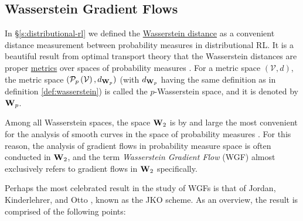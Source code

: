 \subsection{Wasserstein Gradient Flows}\label{s:gradient-flows:wgf}
In \S\ref{s:distributional-rl} we defined the
\hyperref[def:wasserstein]{Wasserstein distance} as a convenient distance
measurement between probability measures in distributional RL. It is a beautiful
result from optimal transport theory that the
Wasserstein distances are proper \hyperref[def:metric-space]{metrics} over
spaces of probability measures \citep{villani2008optimal}. For a metric space
$(\mathcal{V}, d)$, the metric space $(\probset{\mathcal{V}},
\wassermetric[p])$ (with $\wassermetric[p]$ having the same definition as in
definition \ref{def:wasserstein}) is called the $p$-Wasserstein space, and it is denoted by
$\wasserspace[p]$.

Among all Wasserstein spaces, the space $\wasserspace$ is by and large the most
convenient for the analysis of smooth curves in the space of probability
measures \citep{Santambrogio2016EuclideanMA}. For this reason, the analysis of
gradient flows in probability measure space is often conducted in $\wasserspace$,
and the term \emph{Wasserstein Gradient Flow} (WGF) almost exclusively refers to
gradient flows in $\wasserspace$ specifically.

Perhaps the most celebrated result in the study of WGFs is that of Jordan,
Kinderlehrer, and Otto \citep{Jordan02thevariational}, known as the JKO scheme.
As an overview, the result is comprised of the following points:

